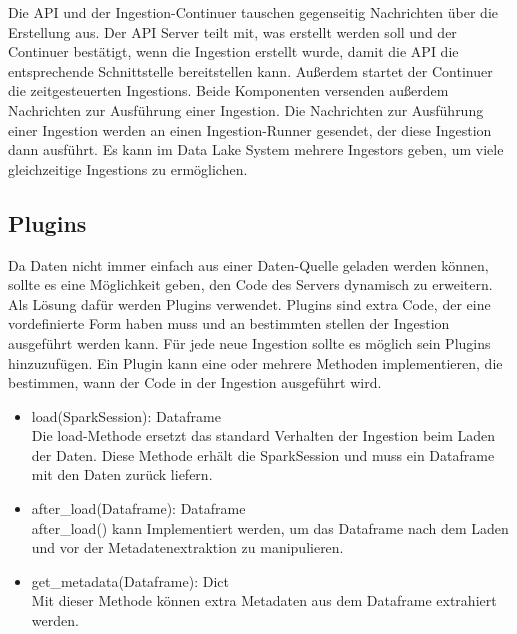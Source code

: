 Die API und der Ingestion-Continuer tauschen gegenseitig Nachrichten über die Erstellung aus. 
Der API Server teilt mit, was erstellt werden soll und der Continuer bestätigt, wenn die Ingestion erstellt wurde, damit die API die entsprechende Schnittstelle bereitstellen kann.
Außerdem startet der Continuer die zeitgesteuerten Ingestions.
Beide Komponenten versenden außerdem Nachrichten zur Ausführung einer Ingestion.
Die Nachrichten zur Ausführung einer Ingestion werden an einen Ingestion-Runner gesendet, der diese Ingestion dann ausführt.
Es kann im Data Lake System mehrere Ingestors geben, um viele gleichzeitige Ingestions zu ermöglichen.

\subsection{Plugins}
Da Daten nicht immer einfach aus einer Daten-Quelle geladen werden können, sollte es eine Möglichkeit geben, den Code des Servers dynamisch zu erweitern.
Als Lösung dafür werden Plugins verwendet.
Plugins sind extra Code, der eine vordefinierte Form haben muss und an bestimmten stellen der Ingestion ausgeführt werden kann.
Für jede neue Ingestion sollte es möglich sein Plugins hinzuzufügen.
Ein Plugin kann eine oder mehrere Methoden implementieren, die bestimmen, wann der Code in der Ingestion ausgeführt wird.
\begin{itemize}
    \item load(SparkSession): Dataframe\\
    Die load-Methode ersetzt das standard Verhalten der Ingestion beim Laden der Daten. 
    Diese Methode erhält die SparkSession und muss ein Dataframe mit den Daten zurück liefern.
    \item after\_load(Dataframe): Dataframe \\ 
    after\_load() kann Implementiert werden, um das Dataframe nach dem Laden und vor der Metadatenextraktion zu manipulieren.
    \item get\_metadata(Dataframe): Dict \\
    Mit dieser Methode können extra Metadaten aus dem Dataframe extrahiert werden.
\end{itemize}

